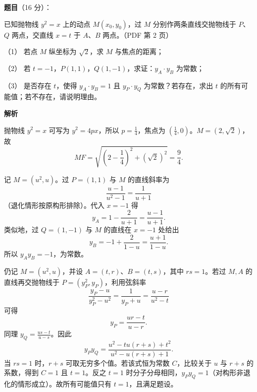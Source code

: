\begin{answer}

\textbf{题目}（16 分）：

已知抛物线 $y^2=x$ 上的动点 $M(x_0,y_0)$，过 $M$ 分别作两条直线交抛物线于 $P$、$Q$ 两点，交直线 $x=t$ 于 $A$、$B$ 两点。（PDF 第 2 页）

（1） 若点 $M$ 纵坐标为 $\sqrt2$，求 $M$ 与焦点的距离；

（2） 若 $t=-1$，$P(1,1)$，$Q(1,-1)$，求证：$y_A\cdot y_B$ 为常数；

（3） 是否存在 $t$，使得 $y_A\cdot y_B=1$ 且 $y_P\cdot y_Q$ 为常数？若存在，求出 $t$ 的所有可能值；若不存在，请说明理由。

\textbf{解析}


抛物线 $y^2=x$ 可写为 $y^2=4px$，所以 $p=\frac14$，焦点为 $(\frac14,0)$。$M=(2,\sqrt2)$，故
\nopagebreak[4]
\[
MF=\sqrt{(2-\frac14)^2+(\sqrt2)^2}=\frac94.
\]


记 $M=(u^2,u)$。过 $P=(1,1)$ 与 $M$ 的直线斜率为
\nopagebreak[4]
\[
\frac{u-1}{u^2-1}=\frac1{u+1}
\]
（退化情形按原构形排除）。代入 $x=-1$ 得
\nopagebreak[4]
\[
y_A=1-\frac2{u+1}=\frac{u-1}{u+1}.
\]
类似地，过 $Q=(1,-1)$ 与 $M$ 的直线在 $x=-1$ 处给出
\nopagebreak[4]
\[
y_B=-1+\frac2{1-u}=\frac{u+1}{1-u}.
\]
所以 $y_Ay_B=-1$，为常数。


仍记 $M=(u^2,u)$，并设 $A=(t,r)$、$B=(t,s)$，其中 $rs=1$。若过 $M,A$ 的直线再交抛物线于 $P=(y_P^2,y_P)$，利用弦斜率
\nopagebreak[4]
\[
\frac{y_P-u}{y_P^2-u^2}=\frac1{y_P+u}
=\frac{u-r}{u^2-t}
\]
可得
\nopagebreak[4]
\[
y_P=\frac{ur-t}{u-r}.
\]
同理 $y_Q=\frac{us-t}{u-s}$。因此
\nopagebreak[4]
\[
y_Py_Q
=\frac{u^2-t u(r+s)+t^2}{u^2-u(r+s)+1}.
\]
当 $r s=1$ 时，$r+s$ 可取无穷多个值。若该式恒为常数 $C$，比较关于 $u$ 与 $r+s$ 的系数，得到 $C=1$ 且 $t=1$。反之 $t=1$ 时分子分母相同，$y_Py_Q=1$（对构形非退化的情形成立）。故所有可能值只有 $t=1$，且满足题设。




\end{answer}
